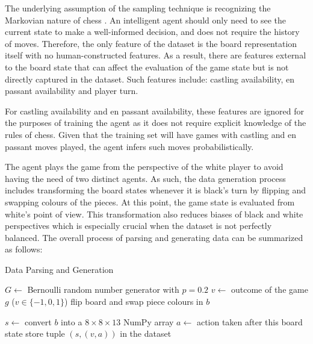 \documentclass[letterpaper]{article} %
\begin{document}
The underlying assumption of the sampling technique is recognizing the Markovian nature of chess \cite{haworth2009performance}. An intelligent agent should only need to see the current state to make a well-informed decision, and does not require the history of moves. Therefore, the only feature of the dataset is the board representation itself with no human-constructed features. As a result, there are features external to the board state that can affect the evaluation of the game state but is not directly captured in the dataset. Such features include: castling availability, en passant availability and player turn.

For castling availability and en passant availability, these features are ignored for the purposes of training the agent as it does not require explicit knowledge of the rules of chess. Given that the training set will have games with castling and en passant moves played, the agent infers such moves probabilistically.

The agent plays the game from the perspective of the white player to avoid having the need of two distinct agents. As such, the data generation process includes transforming the board states whenever it is black's turn by flipping and swapping colours of the pieces. At this point, the game state is evaluated from white's point of view. This transformation also reduces biases of black and white perspectives which is especially crucial when the dataset is not perfectly balanced. The overall process of parsing and generating data can be summarized as follows:

\begin{algorithm}[H]
	\caption{Data Parsing and Generation}
	\begin{algorithmic}[1]
	    \State $G \gets$ Bernoulli random number generator with $p=0.2$
	        \State $v \gets $ outcome of the game $g$ ($v \in \{-1, 0, 1\}$)
	                \State flip board and swap piece colours in $b$
	            \EndIf
	        
    	            \State $s \gets$ convert $b$ into a $8\times8\times13$ NumPy array
    	            \State $a \gets$ action taken after this board state
    	            \State store tuple $(s, (v,a))$ in the dataset
    	       \EndIf
	        \EndFor
	    \EndFor
	\end{algorithmic}
\end{algorithm}
\end{document}
